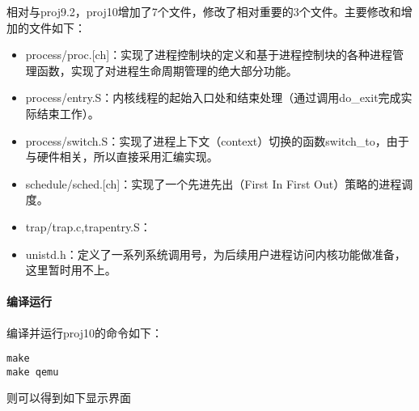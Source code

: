 相对与proj9.2，proj10增加了7个文件，修改了相对重要的3个文件。主要修改和增加的文件如下：

\begin{itemize}
\item
  process/proc.{[}ch{]}：实现了进程控制块的定义和基于进程控制块的各种进程管理函数，实现了对进程生命周期管理的绝大部分功能。
\item
  process/entry.S：内核线程的起始入口处和结束处理（通过调用do\_exit完成实际结束工作）。
\item
  process/switch.S：实现了进程上下文（context）切换的函数switch\_to，由于与硬件相关，所以直接采用汇编实现。
\item
  schedule/sched.{[}ch{]}：实现了一个先进先出（First In First
  Out）策略的进程调度。
\item
  trap/trap.c,trapentry.S：
\item
  unistd.h：定义了一系列系统调用号，为后续用户进程访问内核功能做准备，这里暂时用不上。
\end{itemize}

\paragraph{编译运行}\label{ux7f16ux8bd1ux8fd0ux884c}

编译并运行proj10的命令如下：

\begin{lstlisting}
make
make qemu
\end{lstlisting}

则可以得到如下显示界面

